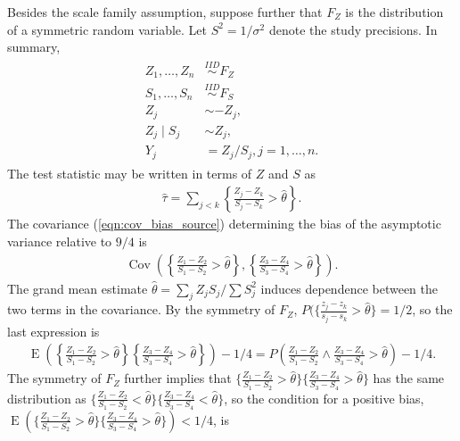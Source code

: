 \documentclass[12pt]{article}
\renewcommand{\P}{P}
\newcommand{\z}{Z}
\newcommand{\y}{Y}
\newcommand{\s}{S}
\newcommand{\x}{X}
\newcommand{\thetahat}{\hat{\theta}}
\newcommand{\zs}[2]{\frac{\z_{#1}-\z_{#2}}{\s_{#1}-\s_{#2}}}
\DeclareMathOperator{\E}{E}
\DeclareMathOperator{\Cov}{Cov}
\begin{document}
    Besides the scale family assumption, suppose
    further that $F_Z$ is the distribution of a symmetric random
    variable. Let $\s^2=1/\sigma^2$ denote the study precisions. In summary,
    \begin{align}
      \begin{split}
        \label{model:symmetric}
        \z_1,\ldots,\z_n &\overset{IID}{\sim} F_Z\\
        \s_1,\ldots,\s_n &\overset{IID}{\sim}  F_S\\
        \z_j &\sim -\z_j,\\
        \z_j \mid \s_j &\sim \z_j,\\
        \y_j&=\z_j/\s_j,j=1,\ldots,n.
      \end{split}
    \end{align}
The test statistic may be written in terms of $\z$ and $\s$ as
    \begin{align}
      \hat\tau=\sum_{j<k}\left\{\frac{\z_j-\z_k}{\s_j-\s_k}>\thetahat\right\}.
    \end{align}
    The covariance (\ref{eqn:cov_bias_source}) determining the bias of the asymptotic variance relative to $9/4$ is
    \begin{align}
      \Cov\left(\left\{\zs{1}{2}>\thetahat\right\},\left\{\zs{3}{4}>\thetahat\right\} \right).
    \end{align}
    The grand mean estimate $\thetahat=\sum_j \z_j\s_j/\sum \s_j^2$ %
    induces dependence
    between the two terms in the covariance. By the symmetry of $F_Z$, $\P(\{\frac{z_j-z_k}{s_j-s_k}>\thetahat\}=1/2$, so the last expression is
    \begin{align}
     \E\left(\left\{\zs{1}{2}>\thetahat\right\}\left\{\zs{3}{4}>\thetahat\right\}\right)-1/4
     =\P\left(\zs{1}{2}\wedge\zs{3}{4}>\thetahat\right)-1/4.
    \end{align}    
    The symmetry of $F_Z$ further implies that $\{\zs{1}{2}>\thetahat\}\{\zs{3}{4}>\thetahat\}$ has the same distribution as $\{\zs{1}{2}<\thetahat\}\{\zs{3}{4}<\thetahat\}$, so the condition for a positive bias, $\E(\{\zs{1}{2}>\thetahat\}\{\zs{3}{4}>\thetahat\})<1/4$, is
\end{document}

